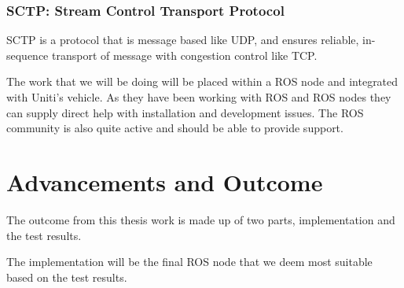 \documentclass[a4paper]{article}
\begin{document}
\subsubsection*{SCTP: Stream Control Transport Protocol}
SCTP is a protocol that is message based like UDP, and ensures reliable,
in-sequence transport of message with congestion control like TCP.
\cite{spec_SCTP}

The work that we will be doing will be placed within a ROS node and integrated
with Uniti's vehicle. As they have been working with ROS and ROS nodes they can
supply direct help with installation and development issues. The ROS community
is also quite active and should be able to provide support.






\section{Advancements and Outcome}




The outcome from this thesis work is made up of two parts, implementation and
the test results.

The implementation will be the final ROS node that we deem most suitable based
on the test results.
\end{document}
